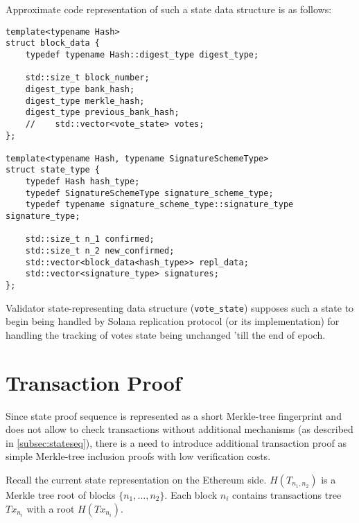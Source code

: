 Approximate code representation of such a state data structure is as follows:
\begin{lstlisting}[frame=single]
template<typename Hash>
struct block_data {
    typedef typename Hash::digest_type digest_type;

    std::size_t block_number;
    digest_type bank_hash;
    digest_type merkle_hash;
    digest_type previous_bank_hash;
    //    std::vector<vote_state> votes;
};

template<typename Hash, typename SignatureSchemeType>
struct state_type {
    typedef Hash hash_type;
    typedef SignatureSchemeType signature_scheme_type;
    typedef typename signature_scheme_type::signature_type signature_type;

    std::size_t n_1 confirmed;
    std::size_t n_2 new_confirmed;
    std::vector<block_data<hash_type>> repl_data;
    std::vector<signature_type> signatures;
};
\end{lstlisting}

Validator state-representing data structure (\texttt{vote\_state}) supposes such
a state to begin being handled by Solana replication protocol (or its
implementation) for handling the tracking of votes state being unchanged 'till
the end of epoch.

\section{Transaction Proof}

Since state proof sequence is represented as a short Merkle-tree fingerprint and 
does not allow to check transactions without additional mechanisms (as described
in \ref{subsec:stateseq}), there is a need to introduce additional transaction 
proof as simple Merkle-tree inclusion proofs with low verification costs. 

Recall the current state representation on the Ethereum side. 
$H(T_{n_1, n_2})$ is a Merkle tree root of blocks $\{n_1, ..., n_2\}$.
Each block $n_i$ contains transactions tree $Tx_{n_i}$ with a root $H(Tx_{n_i})$.

